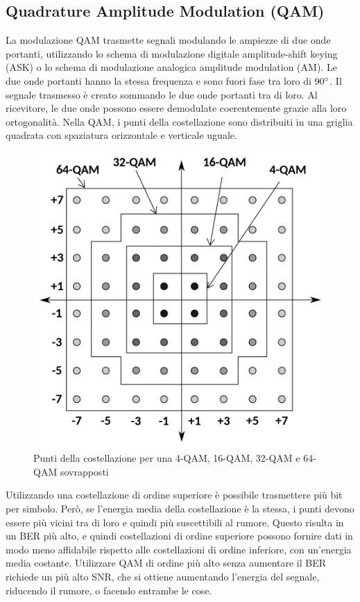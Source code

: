\subsection{Quadrature Amplitude Modulation (QAM)}
La modulazione \ac{QAM} trasmette segnali modulando le ampiezze di due onde portanti, utilizzando lo schema di modulazione digitale amplitude-shift keying (ASK) o lo schema di modulazione analogica amplitude modulation (AM). Le due onde portanti hanno la stessa frequenza e sono fuori fase tra loro di $90\degree$.
Il segnale trasmesso è creato sommando le due onde portanti tra di loro.
Al ricevitore, le due onde possono essere demodulate coerentemente grazie alla loro ortogonalità.
Nella \ac{QAM}, i punti della costellazione sono distribuiti in una griglia quadrata con spaziatura orizzontale e verticale uguale.

\begin{figure}[htbp]
  \centering
  \includegraphics[width=0.6\linewidth]{./res/img/qam.png}
  \caption{Punti della costellazione per una 4-\ac{QAM}, 16-\ac{QAM}, 32-\ac{QAM} e 64-\ac{QAM} sovrapposti}
  \label{fig:qam-diagram}
\end{figure}

Utilizzando una costellazione di ordine superiore è possibile trasmettere più bit per simbolo.
Però, se l'energia media della costellazione è la stessa, i punti devono essere più vicini tra di loro e quindi più suscettibili al rumore.
Questo risulta in un \ac{BER} più alto, e quindi costellazioni di ordine superiore possono fornire dati in modo meno affidabile rispetto alle costellazioni di ordine inferiore, con un'energia media costante.
Utilizzare \ac{QAM} di ordine più alto senza aumentare il \ac{BER} richiede un più alto \ac{SNR}, che si ottiene aumentando l'energia del segnale, riducendo il rumore, o facendo entrambe le cose.

